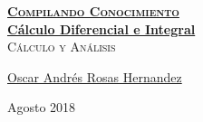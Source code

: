 \documentclass[12pt, fleqn]{report}                             %
\author{Oscar Andrés Rosas}                                     %
\theoremstyle{break}                                            %
\begin{document}
\begin{titlepage}
    
    \pagecolor{TitlePageColor}                                      %
    \color{white}                                                   %

    \vspace                                                         %
    \baselineskip                                                   %

    \makebox[0pt][l]{\rule{1.3\textwidth}{3pt}}                     %
    
    \href{https://compilandoconocimiento.com}                       %
    {\textbf{\textsc{\Huge Compilando Conocimiento}}}\\[2.7cm]      %

    \href{\ProjectNameLink}                                         %
    {\fontsize{30}{40}                                              %
        \selectfont \textbf{Cálculo Diferencial e Integral}}\\[0.5cm]   %
    \textcolor{ColorSubtext}                                        %
        {\textsc{\LARGE Cálculo y Análisis}}                        %
    
    \vfill                                                          %
    
    \href{https://compilandoconocimiento.com/nosotros}              %
    {\LARGE \textsf{Oscar Andrés Rosas Hernandez}}                  %


    \vspace                                                         %
    \baselineskip                                                   %
    
    {\large \textsf{Agosto 2018}}                                   %

\end{titlepage}
\end{document}
